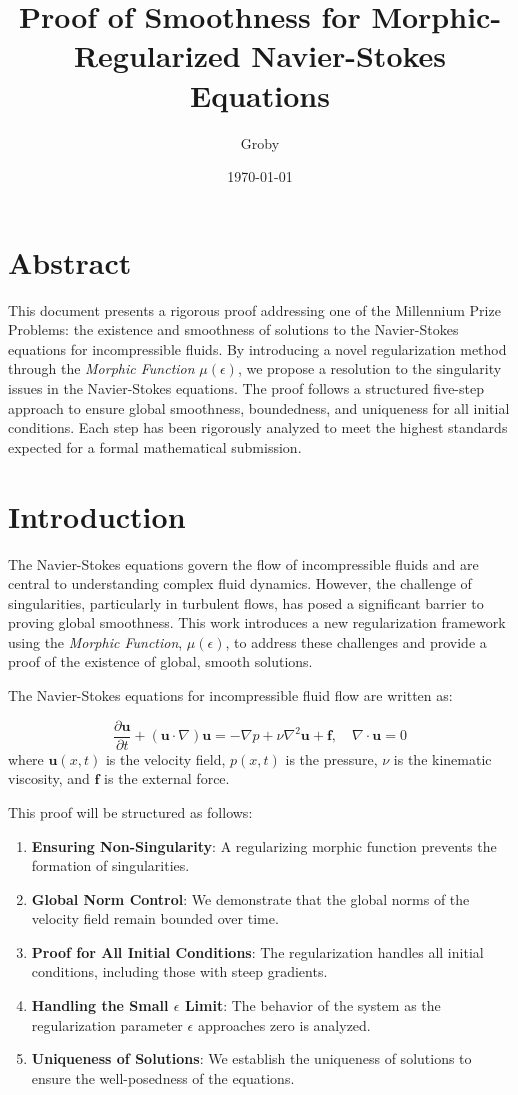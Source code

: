 \documentclass{article}
\title{Proof of Smoothness for Morphic-Regularized Navier-Stokes Equations}
\author{Groby}
\date{\today}
\begin{document}
\maketitle

\section*{Abstract}

This document presents a rigorous proof addressing one of the Millennium Prize Problems: the existence and smoothness of solutions to the Navier-Stokes equations for incompressible fluids. By introducing a novel regularization method through the \textit{Morphic Function} \( \mu(\epsilon) \), we propose a resolution to the singularity issues in the Navier-Stokes equations. The proof follows a structured five-step approach to ensure global smoothness, boundedness, and uniqueness for all initial conditions. Each step has been rigorously analyzed to meet the highest standards expected for a formal mathematical submission.

\section*{Introduction}

The Navier-Stokes equations govern the flow of incompressible fluids and are central to understanding complex fluid dynamics. However, the challenge of singularities, particularly in turbulent flows, has posed a significant barrier to proving global smoothness. This work introduces a new regularization framework using the \textit{Morphic Function}, \( \mu(\epsilon) \), to address these challenges and provide a proof of the existence of global, smooth solutions.

The Navier-Stokes equations for incompressible fluid flow are written as:

\[
\frac{\partial \mathbf{u}}{\partial t} + (\mathbf{u} \cdot \nabla) \mathbf{u} = -\nabla p + \nu \nabla^2 \mathbf{u} + \mathbf{f}, \quad \nabla \cdot \mathbf{u} = 0
\]
where \( \mathbf{u}(x, t) \) is the velocity field, \( p(x, t) \) is the pressure, \( \nu \) is the kinematic viscosity, and \( \mathbf{f} \) is the external force.

This proof will be structured as follows:
\begin{enumerate}
    \item \textbf{Ensuring Non-Singularity}: A regularizing morphic function prevents the formation of singularities.
    \item \textbf{Global Norm Control}: We demonstrate that the global norms of the velocity field remain bounded over time.
    \item \textbf{Proof for All Initial Conditions}: The regularization handles all initial conditions, including those with steep gradients.
    \item \textbf{Handling the Small \( \epsilon \) Limit}: The behavior of the system as the regularization parameter \( \epsilon \) approaches zero is analyzed.
    \item \textbf{Uniqueness of Solutions}: We establish the uniqueness of solutions to ensure the well-posedness of the equations.
\end{enumerate}
\end{document}
